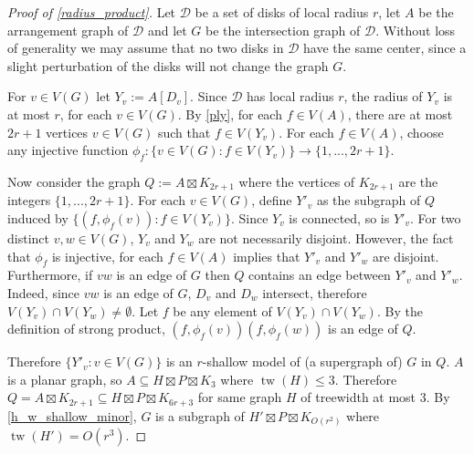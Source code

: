 \documentclass{patmorin}
\DeclareMathOperator{\tw}{tw}
\begin{document}
\begin{proof}[Proof of \cref{radius_product}]
  Let $\mathcal{D}$ be a set of disks of local radius $r$, let $A$ be the arrangement graph of $\mathcal{D}$ and let $G$ be the intersection graph of $\mathcal{D}$. Without loss of generality we may assume that no two disks in $\mathcal{D}$ have the same center, since a slight perturbation of the disks will not change the graph $G$.

  For $v\in V(G)$ let $Y_v:=A[D_v]$.  Since $\mathcal{D}$ has local radius $r$,  the radius of $Y_v$ is at most $r$, for each $v\in V(G)$. By \cref{ply}, for each  $f\in V(A)$, there are at most $2r+1$ vertices $v\in V(G)$ such that $f\in V(Y_v)$.  For each $f\in V(A)$, choose any injective function $\phi_f: \{v \in V(G): f \in V(Y_v)\}\to\{1,...,2r+1\}$.

  Now consider the graph $Q:=A \boxtimes K_{2r+1}$ where the vertices of $K_{2r+1}$ are the integers $\{1,...,2r+1\}$.  For each $v\in V(G)$, define $Y'_v$ as the subgraph of $Q$ induced by $\{(f, \phi_f(v)): f \in V(Y_v)\}$.  Since $Y_v$ is connected, so is $Y'_v$. For two distinct $v,w \in V(G)$, $Y_v$ and $Y_w$ are not necessarily disjoint.  However, the fact that $\phi_f$ is injective, for each $f\in V(A)$ implies that $Y'_v$ and $Y'_w$ are disjoint.  Furthermore, if $vw$ is an edge of $G$ then $Q$ contains an edge between $Y'_v$ and $Y'_w$.  Indeed, since $vw$ is an edge of $G$, $D_v$ and $D_w$ intersect, therefore $V(Y_v)\cap V(Y_w)\neq\emptyset$. Let $f$ be any element of $V(Y_v)\cap V(Y_w)$.  By the definition of strong product,  $(f,\phi_f(v))(f,\phi_f(w))$ is an edge of $Q$.

  Therefore $\{Y'_v : v \in V(G)\}$ is an $r$-shallow model of (a supergraph of) $G$ in $Q$.   $A$ is a planar graph, so $A\subseteq H\boxtimes P\boxtimes K_3$ where $\tw(H)\le 3$. Therefore $Q=A\boxtimes K_{2r+1}\subseteq H\boxtimes P\boxtimes K_{6r+3}$ for same graph $H$ of treewidth at most $3$.  By \cref{h_w_shallow_minor}, $G$ is a subgraph of $H' \boxtimes P \boxtimes K_{O(r^2)}$ where $\tw(H') = O(r^3)$.
\end{proof}




\end{document}
